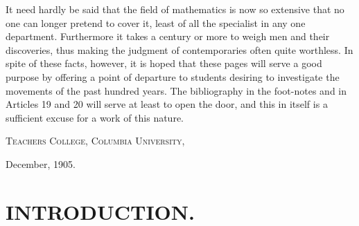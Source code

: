 \documentclass[oneside]{book}
\begin{document}
It need hardly be said that the field of mathematics is now so
extensive that no one can longer pretend to cover it, least of all
the specialist in any one department. Furthermore it takes a century
or more to weigh men and their discoveries, thus making the
judgment of contemporaries often quite worthless. In spite of these
facts, however, it is hoped that these pages will serve a good
purpose by offering a point of departure to students desiring to
investigate the movements of the past hundred years. The
bibliography in the foot-notes and in Articles 19 and 20 will serve
at least to open the door, and this in itself is a sufficient excuse
for a work of this nature.

\textsc{Teachers College, Columbia University,}

December, 1905.

\normalsize

\tableofcontents
























\mainmatter

\chapter{INTRODUCTION.}
\end{document}
